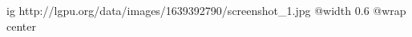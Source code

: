  
 
 
 
 

\ifcmt
  ig http://lgpu.org/data/images/1639392790/screenshot_1.jpg
  @width 0.6
	@wrap center
\fi

